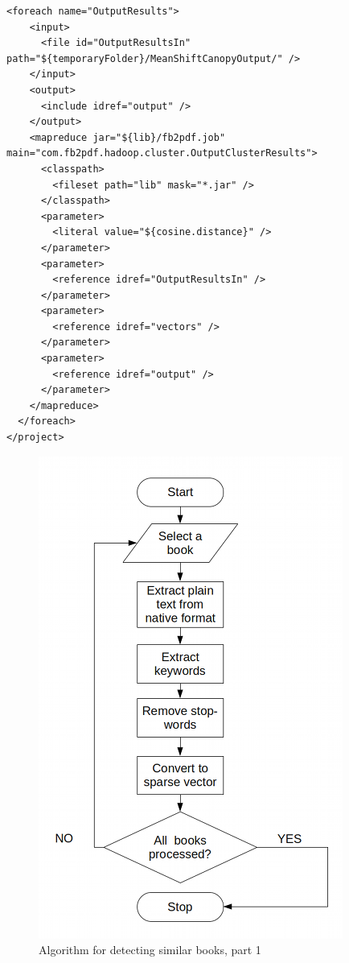 \documentclass{article}
\begin{document}
\begin{lstlisting}[caption={Hamake file, that describes process for detecting similar books},label=hamakeFile]
  <foreach name="OutputResults">
    <input>
      <file id="OutputResultsIn" path="${temporaryFolder}/MeanShiftCanopyOutput/" />
    </input>
    <output>
      <include idref="output" />
    </output>
    <mapreduce jar="${lib}/fb2pdf.job" main="com.fb2pdf.hadoop.cluster.OutputClusterResults">
      <classpath>
        <fileset path="lib" mask="*.jar" />
      </classpath>
      <parameter>
        <literal value="${cosine.distance}" />
      </parameter>
      <parameter>
        <reference idref="OutputResultsIn" />
      </parameter>
      <parameter>
        <reference idref="vectors" />
      </parameter>
      <parameter>
        <reference idref="output" />
      </parameter>
    </mapreduce>
  </foreach>
</project>
\end{lstlisting}

\begin{figure}[htp]
\centering
\includegraphics[width=10cm]{SimilarityAlgPart1.png}
\caption{Algorithm for detecting similar books, part 1}
\label{fig:SimilarityAlg1}
\end{figure}
\end{document}
